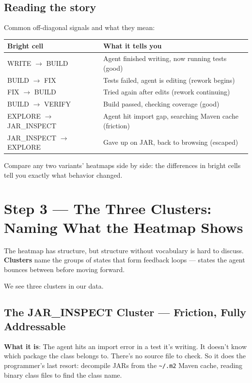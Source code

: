 \documentclass[11pt,a4paper]{article}
\begin{document}
\subsection*{Reading the story}

Common off-diagonal signals and what they mean:

\begin{center}
\begin{tabular}{@{}l p{8cm}@{}}
\toprule
\textbf{Bright cell} & \textbf{What it tells you} \\
\midrule
WRITE $\to$ BUILD       & Agent finished writing, now running tests (good) \\
BUILD $\to$ FIX         & Tests failed, agent is editing (rework begins) \\
FIX $\to$ BUILD         & Tried again after edits (rework continuing) \\
BUILD $\to$ VERIFY      & Build passed, checking coverage (good) \\
EXPLORE $\to$ JAR\_INSPECT & Agent hit import gap, searching Maven cache (friction) \\
JAR\_INSPECT $\to$ EXPLORE & Gave up on JAR, back to browsing (escaped) \\
\bottomrule
\end{tabular}
\end{center}

Compare any two variants' heatmaps side by side:
the differences in bright cells tell you exactly what behavior changed.

\section{Step 3 --- The Three Clusters: Naming What the Heatmap Shows}

The heatmap has structure, but structure without vocabulary is hard to discuss.
\textbf{Clusters} name the groups of states that form feedback loops ---
states the agent bounces between before moving forward.

We see three clusters in our data.

\subsection{The JAR\_INSPECT Cluster --- Friction, Fully Addressable}

\textbf{What it is}:
The agent hits an import error in a test it's writing.
It doesn't know which package the class belongs to.
There's no source file to check.
So it does the programmer's last resort: decompile JARs from the
\texttt{\textasciitilde/.m2} Maven cache, reading binary class files to find the class name.
\end{document}

